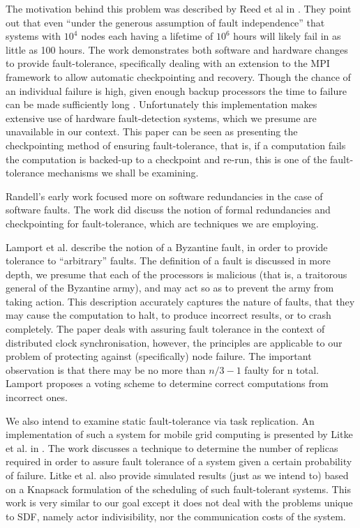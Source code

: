 The motivation behind this problem was described by Reed et al in \cite{ree06}.
They point out that even ``under the generous assumption of fault independence'' that systems with $10^4$ nodes each having a lifetime of $10^6$ hours will likely fail in as little as 100 hours.
The work demonstrates both software and hardware changes to provide fault-tolerance, specifically dealing with an extension to the MPI framework to allow automatic checkpointing and recovery.
Though the chance of an individual failure is high, given enough backup processors the time to failure can be made sufficiently long \cite{ree06}.
Unfortunately this implementation makes extensive use of hardware fault-detection systems, which we presume are unavailable in our context.
This paper can be seen as presenting the checkpointing method of ensuring fault-tolerance, that is, if a computation fails the computation is backed-up to a checkpoint and re-run, this is one of the fault-tolerance mechanisms we shall be examining.

Randell's early work \cite{ran75} focused more on software redundancies in the case of software faults.
The work did discuss the notion of formal redundancies and checkpointing for fault-tolerance, which are techniques we are employing.

Lamport et al. \cite{lam86} describe the notion of a Byzantine fault, in order to provide tolerance to ``arbitrary'' faults.
The definition of a fault is discussed in more depth, we presume that each of the processors is malicious (that is, a traitorous general of the Byzantine army), and may act so as to prevent the army from taking action.
This description accurately captures the nature of faults, that they may cause the computation to halt, to produce incorrect results, or to crash completely.
The paper deals with assuring fault tolerance in the context of distributed clock synchronisation, however, the principles are applicable to our problem of protecting against (specifically) node failure.
The important observation is that there may be no more than $n/3 - 1$ faulty for n total.
Lamport proposes a voting scheme \cite{lam86} to determine correct computations from incorrect ones.

We also intend to examine static fault-tolerance via task replication.
An implementation of such a system for mobile grid computing is presented by Litke et al. in \cite{lit07}.
The work discusses a technique to determine the number of replicas required in order to assure fault tolerance of a system given a certain probability of failure.
Litke et al. also provide simulated results (just as we intend to) based on a Knapsack formulation of the scheduling of such fault-tolerant systems.
This work is very similar to our goal except it does not deal with the problems unique to SDF, namely actor indivisibility, nor the communication costs of the system.

